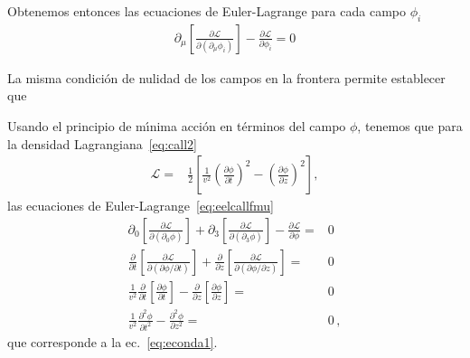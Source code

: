 \begin{frame}
Obtenemos entonces las ecuaciones de Euler-Lagrange para cada campo $\phi_i$
\begin{align}
\label{eq:eelcallfmu}
  \partial_{\mu} \left[ \frac{\partial\mathcal{L}}{\partial(\partial_{\mu}\phi_i)}\right]-\frac{\partial\mathcal{L}}{\partial\phi_i}=0
\end{align}

La misma condición de nulidad de los campos en la frontera permite establecer que 
\end{frame}

Usando el principio de m\'\i nima acci\'on en t\'erminos del campo $\phi$, tenemos que para la densidad Lagrangiana~\eqref{eq:call2}
\begin{align}
  \mathcal{L}=&\frac{1}{2}  \left[
  \frac{1}{v^2}\left(\frac{\partial\phi}{\partial t}\right)^2-\left(\frac{\partial\phi}{\partial z}\right)^2
\right],
\end{align}
las ecuaciones de Euler-Lagrange~\eqref{eq:eelcallfmu}
\begin{align}
  \partial_0\left[\frac{\partial\mathcal{L}}{\partial(\partial_0\phi)}\right]+
\partial_3\left[\frac{\partial\mathcal{L}}{\partial(\partial_3\phi)}\right]
-\frac{\partial\mathcal{L}}{\partial\phi}=&0\nonumber\\
  \frac{\partial}{\partial t}\left[\frac{\partial\mathcal{L}}{\partial(\partial\phi/\partial t)}\right]+
\frac{\partial}{\partial z}\left[\frac{\partial\mathcal{L}}{\partial(\partial\phi/\partial z)}\right]
=&0\nonumber\\
 \frac{1}{v^2}\frac{\partial}{\partial t}\left[\frac{\partial\phi}{\partial t}\right]
-\frac{\partial}{\partial z}\left[\frac{\partial\phi}{\partial z}\right]=&0\nonumber\\
 \frac{1}{v^2}\frac{\partial^2\phi}{\partial t^2}-\frac{\partial^2\phi}{\partial z^2}=&0\,,
\end{align}
que corresponde a la ec.~\eqref{eq:econda1}.


